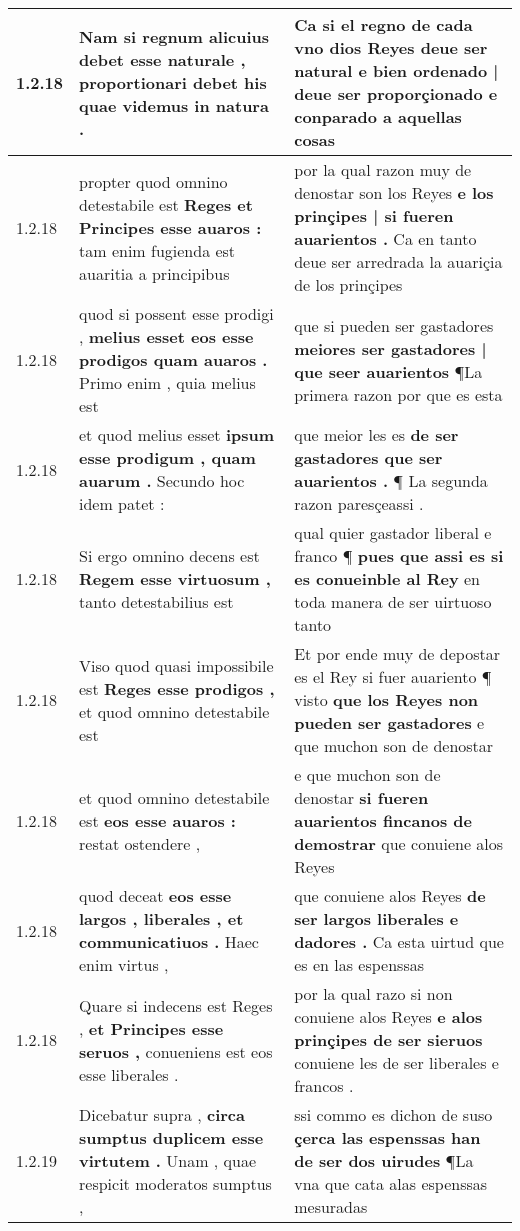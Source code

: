\begin{tabular}{|p{1cm}|p{6.5cm}|p{6.5cm}|}
1.2.18 & Nam si regnum alicuius debet \textbf{ esse naturale , } proportionari debet his quae videmus in natura . & Ca si el regno de cada vno dios Reyes deue ser natural \textbf{ e bien ordenado | deue ser proporçionado } e conparado a aquellas cosas \\\hline
1.2.18 & propter quod omnino detestabile est \textbf{ Reges et Principes esse auaros : } tam enim fugienda est auaritia a principibus & por la qual razon muy de denostar son los Reyes \textbf{ e los prinçipes | si fueren auarientos . } Ca en tanto deue ser arredrada la auariçia de los prinçipes \\\hline
1.2.18 & quod si possent esse prodigi , \textbf{ melius esset eos esse prodigos quam auaros . } Primo enim , quia melius est & que si pueden ser gastadores \textbf{ meiores ser gastadores | que seer auarientos } ¶La primera razon por que es esta \\\hline
1.2.18 & et quod melius esset \textbf{ ipsum esse prodigum , quam auarum . } Secundo hoc idem patet : & que meior les es \textbf{ de ser gastadores que ser auarientos . } ¶ La segunda razon paresçeassi . \\\hline
1.2.18 & Si ergo omnino decens est \textbf{ Regem esse virtuosum , } tanto detestabilius est & qual quier gastador liberal e franco ¶ \textbf{ pues que assi es si es conueinble al Rey } en toda manera de ser uirtuoso tanto \\\hline
1.2.18 & Viso quod quasi impossibile est \textbf{ Reges esse prodigos , } et quod omnino detestabile est & Et por ende muy de depostar es el Rey si fuer auariento ¶ visto \textbf{ que los Reyes non pueden ser gastadores } e que muchon son de denostar \\\hline
1.2.18 & et quod omnino detestabile est \textbf{ eos esse auaros : } restat ostendere , & e que muchon son de denostar \textbf{ si fueren auarientos fincanos de demostrar } que conuiene alos Reyes \\\hline
1.2.18 & quod deceat \textbf{ eos esse largos , liberales , et communicatiuos . } Haec enim virtus , & que conuiene alos Reyes \textbf{ de ser largos liberales e dadores . } Ca esta uirtud que es en las espenssas \\\hline
1.2.18 & Quare si indecens est Reges , \textbf{ et Principes esse seruos , } conueniens est eos esse liberales . & por la qual razo si non conuiene alos Reyes \textbf{ e alos prinçipes de ser sieruos } conuiene les de ser liberales e francos . \\\hline
1.2.19 & Dicebatur supra , \textbf{ circa sumptus duplicem esse virtutem . } Unam , quae respicit moderatos sumptus , & ssi commo es dichon de suso \textbf{ çerca las espenssas han de ser dos uirudes } ¶La vna que cata alas espenssas mesuradas \\\hline

\end{tabular}
